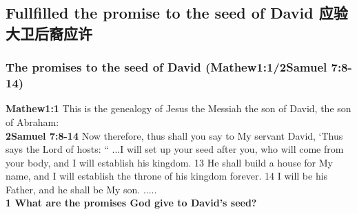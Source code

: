 \subsection{Fullfilled the promise to the seed of David 应验大卫后裔应许}


\subsubsection{The promises to the seed of David (Mathew1:1/2Samuel 7:8-14)}
\textbf{Mathew1:1} This is the genealogy of Jesus the Messiah the son of David, the son of Abraham:\\
\textbf{2Samuel 7:8-14} Now therefore, thus shall you say to My servant David, ‘Thus says the Lord of hosts: “ ...I will set up your seed after you, who will come from your body, and I will establish his kingdom. 13 He shall build a house for My name, and I will establish the throne of his kingdom forever. 14 I will be his Father, and he shall be My son. .....\\

\textbf{1 What are the promises God give to David's seed?}\\


